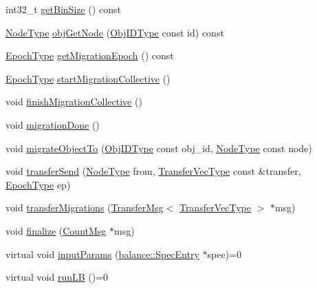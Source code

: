 \begin{DoxyCompactItemize}
\item 
int32\+\_\+t \hyperlink{structvt_1_1vrt_1_1collection_1_1lb_1_1_base_l_b_ae09296e84f0ffec68a169dcec197ec26}{get\+Bin\+Size} () const
\item 
\hyperlink{namespacevt_a866da9d0efc19c0a1ce79e9e492f47e2}{Node\+Type} \hyperlink{structvt_1_1vrt_1_1collection_1_1lb_1_1_base_l_b_a9c01cfa62a37b6c1fd9b2d8791bbcacc}{obj\+Get\+Node} (\hyperlink{structvt_1_1vrt_1_1collection_1_1lb_1_1_base_l_b_a15a2f756b59c8c2437985206b32aa403}{Obj\+I\+D\+Type} const id) const
\item 
\hyperlink{namespacevt_a985a5adf291c34a3ca263b3378388236}{Epoch\+Type} \hyperlink{structvt_1_1vrt_1_1collection_1_1lb_1_1_base_l_b_a1e088f794f3addbffd867cbe8f1a797d}{get\+Migration\+Epoch} () const
\item 
\hyperlink{namespacevt_a985a5adf291c34a3ca263b3378388236}{Epoch\+Type} \hyperlink{structvt_1_1vrt_1_1collection_1_1lb_1_1_base_l_b_ad95ab3276ed8da0811b3534668127f84}{start\+Migration\+Collective} ()
\item 
void \hyperlink{structvt_1_1vrt_1_1collection_1_1lb_1_1_base_l_b_a682072cad79474ddf1faa5ee98a85a5a}{finish\+Migration\+Collective} ()
\item 
void \hyperlink{structvt_1_1vrt_1_1collection_1_1lb_1_1_base_l_b_ac8ed2cc09aec1f84e179ba734da71960}{migration\+Done} ()
\item 
void \hyperlink{structvt_1_1vrt_1_1collection_1_1lb_1_1_base_l_b_a952846044ca0d13d25ca828b84112d0e}{migrate\+Object\+To} (\hyperlink{structvt_1_1vrt_1_1collection_1_1lb_1_1_base_l_b_a15a2f756b59c8c2437985206b32aa403}{Obj\+I\+D\+Type} const obj\+\_\+id, \hyperlink{namespacevt_a866da9d0efc19c0a1ce79e9e492f47e2}{Node\+Type} const node)
\item 
void \hyperlink{structvt_1_1vrt_1_1collection_1_1lb_1_1_base_l_b_a60135618fefc0ad5d09638f29a848be7}{transfer\+Send} (\hyperlink{namespacevt_a866da9d0efc19c0a1ce79e9e492f47e2}{Node\+Type} from, \hyperlink{structvt_1_1vrt_1_1collection_1_1lb_1_1_base_l_b_a329e8179ec41a1bd4924c79fe23a79af}{Transfer\+Vec\+Type} const \&transfer, \hyperlink{namespacevt_a985a5adf291c34a3ca263b3378388236}{Epoch\+Type} ep)
\item 
void \hyperlink{structvt_1_1vrt_1_1collection_1_1lb_1_1_base_l_b_adb9e1197bc690340bc1a4a6c77ac5254}{transfer\+Migrations} (\hyperlink{structvt_1_1vrt_1_1collection_1_1lb_1_1_transfer_msg}{Transfer\+Msg}$<$ \hyperlink{structvt_1_1vrt_1_1collection_1_1lb_1_1_base_l_b_a329e8179ec41a1bd4924c79fe23a79af}{Transfer\+Vec\+Type} $>$ $\ast$msg)
\item 
void \hyperlink{structvt_1_1vrt_1_1collection_1_1lb_1_1_base_l_b_a66f2b22d12492c145a3d567ebd67194b}{finalize} (\hyperlink{structvt_1_1vrt_1_1collection_1_1lb_1_1_count_msg}{Count\+Msg} $\ast$msg)
\item 
virtual void \hyperlink{structvt_1_1vrt_1_1collection_1_1lb_1_1_base_l_b_a555e29aadfd428383464d6dd007506b6}{input\+Params} (\hyperlink{structvt_1_1vrt_1_1collection_1_1balance_1_1_spec_entry}{balance\+::\+Spec\+Entry} $\ast$spec)=0
\item 
virtual void \hyperlink{structvt_1_1vrt_1_1collection_1_1lb_1_1_base_l_b_a69a398c54f8129f365171a1189ffcd84}{run\+LB} ()=0
\end{DoxyCompactItemize}
